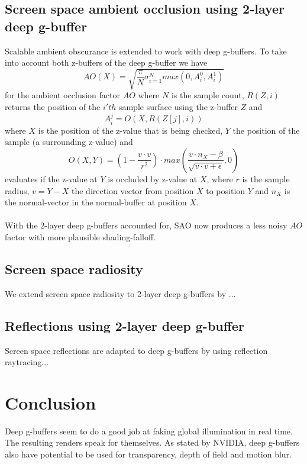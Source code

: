 \documentclass{ACGSeminar}
\begin{document}
	\subsection{Screen space ambient occlusion using 2-layer deep g-buffer}
		Scalable ambient obscurance \cite{SAO} is extended to work with deep g-buffers. To take into account both z-buffers of the deep g-buffer we have
		$$ AO(X) = \sqrt{\frac{\pi}{N} \sigma_{i=1}^{N} max(0, A_{i}^{0}, A_{i}^{1})} $$
		for the ambient occlusion factor $AO$ where $N$ is the sample count, $R(Z, i)$ returns the position of the $i'th$ sample surface using the z-buffer $Z$ and
		$$ A_{i}^{j} = O(X, R(Z[j], i))$$
		where $X$ is the position of the z-value that is being checked, $Y$ the position of the sample (a surrounding z-value) and
		$$ O(X, Y) = (1 - \frac{v \cdot v}{r^2}) \cdot max(\frac{v \cdot n_X - \beta}{\sqrt{v \cdot v + \epsilon}}, 0) $$
		evaluates if the z-value at $Y$ is occluded by z-value at $X$, where $r$ is the sample radius, $v = Y - X$ the direction vector from position $X$ to position $Y$ and $n_X$ is the normal-vector in the normal-buffer at position $X$. \\\\
		With the 2-layer deep g-buffers accounted for, SAO now produces a less noisy $AO$ factor with more plausible shading-falloff. 
		
	\subsection{Screen space radiosity}
		We extend screen space radiosity to 2-layer deep g-buffers by  ... 

	\subsection{Reflections using 2-layer deep g-buffer}
		Screen space reflections are adapted to deep g-buffers by using reflection raytracing... 

\section{Conclusion}
	Deep g-buffers seem to do a good job at faking global illumination in real time. The resulting renders speak for themselves. As stated by NVIDIA, deep g-buffers also have potential to be used for transparency, depth of field and motion blur.

\printbibliography
\end{document}
